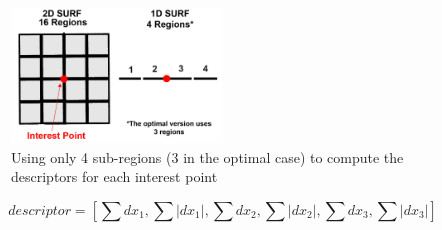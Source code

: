 \begin{figure}[h!] 
  \centering
    \includegraphics[width=0.5\textwidth]{../Drawings/methods/SURF1D_Descriptor.jpg}
    \caption{Using only 4 sub-regions (3 in the optimal case) to compute the descriptors for each interest point}
    \label{fig:subregions4}
\end{figure}


\begin{equation}
descriptor = [ \sum dx_1, \sum |dx_1|,\sum dx_2, \sum |dx_2|,\sum dx_3, \sum |dx_3|] 
\label{eqn:descriptor1d}
\end{equation}
